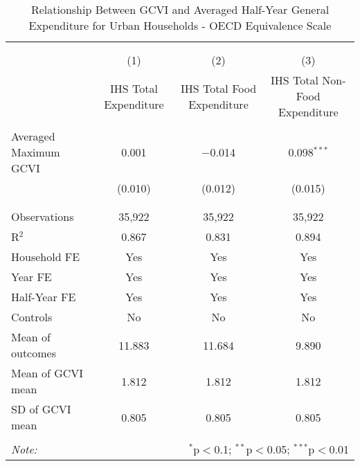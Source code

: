 
\begin{table}[!htbp] \centering 
  \caption{Relationship Between GCVI and Averaged Half-Year General Expenditure for Urban Households - OECD Equivalence Scale} 
  \label{gcvi_table_5_rural.tex} 
\normalsize 
\begin{tabular}{@{\extracolsep{5pt}}lccc} 
\\[-1.8ex]\hline 
\hline \\[-1.8ex] 
\\[-1.8ex] & (1) & (2) & (3)\\ 
 & IHS Total Expenditure & IHS Total Food Expenditure & IHS Total Non-Food Expenditure \\ 
\hline \\[-1.8ex] 
 Averaged Maximum GCVI & 0.001 & $-$0.014 & 0.098$^{***}$ \\ 
  & (0.010) & (0.012) & (0.015) \\ 
  & & & \\ 
\hline \\[-1.8ex] 
Observations & 35,922 & 35,922 & 35,922 \\ 
R$^{2}$ & 0.867 & 0.831 & 0.894 \\ 
Household FE & Yes & Yes & Yes \\ 
Year FE & Yes & Yes & Yes \\ 
Half-Year FE & Yes & Yes & Yes \\ 
Controls & No & No & No \\ 
Mean of outcomes & 11.883 & 11.684 & 9.890 \\ 
Mean of GCVI mean & 1.812 & 1.812 & 1.812 \\ 
SD of GCVI mean & 0.805 & 0.805 & 0.805 \\ 
\hline \\[-1.8ex] 
\textit{Note:}  & \multicolumn{3}{r}{$^{*}$p$<$0.1; $^{**}$p$<$0.05; $^{***}$p$<$0.01} \\ 
\end{tabular} 
\end{table} 
